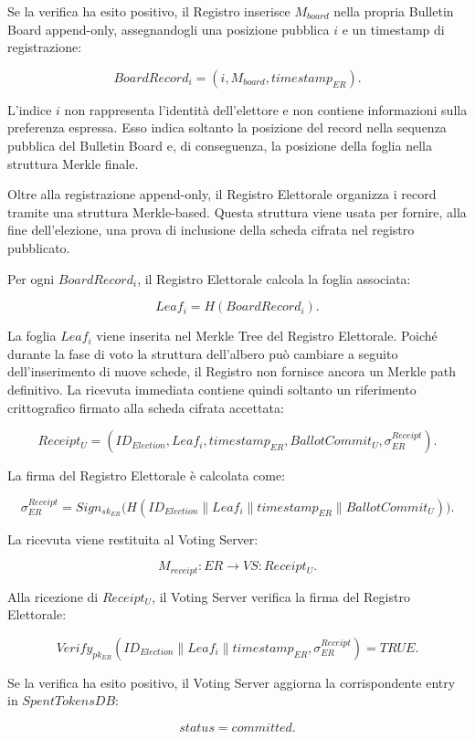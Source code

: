 \documentclass[a4paper,12pt]{article}
\begin{document}
Se la verifica ha esito positivo, il Registro inserisce \(M_{board}\) nella propria Bulletin Board append-only, assegnandogli una posizione pubblica \(i\) e un timestamp di registrazione:

\[
	BoardRecord_i =
	(i, M_{board}, timestamp_{ER}).
\]

L'indice \(i\) non rappresenta l'identit\`a dell'elettore e non contiene informazioni sulla preferenza espressa.
Esso indica soltanto la posizione del record nella sequenza pubblica del Bulletin Board e, di conseguenza, la posizione della foglia nella struttura Merkle finale.

Oltre alla registrazione append-only, il Registro Elettorale organizza i record tramite una struttura Merkle-based.
Questa struttura viene usata per fornire, alla fine dell'elezione, una prova di inclusione della scheda cifrata nel registro pubblicato.

Per ogni \(BoardRecord_i\), il Registro Elettorale calcola la foglia associata:

\[
	Leaf_i =
	H(BoardRecord_i).
\]

La foglia \(Leaf_i\) viene inserita nel Merkle Tree del Registro Elettorale.
Poich\'e durante la fase di voto la struttura dell'albero pu\`o cambiare a seguito dell'inserimento di nuove schede, il Registro non fornisce ancora un Merkle path definitivo.
La ricevuta immediata contiene quindi soltanto un riferimento crittografico firmato alla scheda cifrata accettata:

\[
	Receipt_U =
	(ID_{Election}, Leaf_i, timestamp_{ER}, BallotCommit_U, \sigma_{ER}^{Receipt}).
\]

La firma del Registro Elettorale \`e calcolata come:

\[
	\sigma_{ER}^{Receipt} =
	Sign_{sk_{ER}}
	\big(
	H(ID_{Election} \parallel Leaf_i \parallel timestamp_{ER}\parallel BallotCommit_U)
	\big).
\]

La ricevuta viene restituita al Voting Server:

\[
	M_{receipt} : ER \rightarrow VS :
	Receipt_U.
\]

Alla ricezione di \(Receipt_U\), il Voting Server verifica la firma del Registro Elettorale:

\[
	Verify_{pk_{ER}}(ID_{Election} \parallel Leaf_i \parallel timestamp_{ER}, \sigma_{ER}^{Receipt}) = TRUE.
\]

Se la verifica ha esito positivo, il Voting Server aggiorna la corrispondente entry in \(SpentTokensDB\):

\[
	status = committed.
\]
\end{document}
